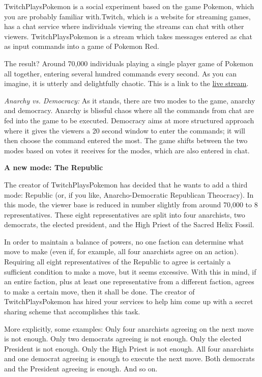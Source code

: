 \documentclass[]{article}
\begin{document}
\begin{qunlist}
TwitchPlaysPokemon is a social experiment based on the game Pokemon, which you are probably familiar with.Twitch, which is a website for streaming games, has a chat service where individuals viewing the streams can chat with other viewers. TwitchPlaysPokemon is a stream which takes messages entered as chat as input commands into a game of Pokemon Red.

The result? Around 70,000 individuals playing a single player game of Pokemon all together, entering several hundred commands every second. As you can imagine, it is utterly and delightfully chaotic. This is a link to the \href{http://www.twitch.tv/twitchplayspokemon}{live stream}.

\textit{Anarchy vs. Democracy:}
As it stands, there are two modes to the game, anarchy and democracy. Anarchy is blissful chaos where all the commands from chat are fed into the game to be executed. Democracy aims at more structured approach where it gives the viewers a 20 second window to enter the commands; it will then choose the command entered the most. The game shifts between the two modes based on votes it receives for the modes, which are also entered in chat.

\newpage
\textbf{A new mode: The Republic}

The creator of TwitchPlaysPokemon has decided that he wants to add a third mode: Republic (or, if you like, Anarcho-Democratic Republican Theocracy). 
In this mode, the viewer base is reduced in number slightly from around 70,000 to 8 representatives. 
These eight representatives are split into four anarchists, two democrats, the elected president, and the High Priest of the Sacred Helix Fossil. 

In order to maintain a balance of powers, no one faction can determine what move to make (even if, for example, all four anarchists agree on an action). Requiring all eight representatives of the Republic to agree is certainly a sufficient condition to make a move, but it seems excessive. With this in mind, if an entire faction, plus at least one representative from a different faction, agrees to make a certain move, then it shall be done.
The creator of TwitchPlaysPokemon has hired your services to help him come up with a secret sharing scheme that accomplishes this task.

More explicitly, some examples: 
Only four anarchists agreeing on the next move is not enough. 
Only two democrats agreeing is not enough. 
Only the elected President is not enough. 
Only the High Priest is not enough. 
All four anarchists and one democrat agreeing is enough to execute the next move.
Both democrats and the President agreeing is enough.
And so on.


\end{qunlist}
\end{document}
